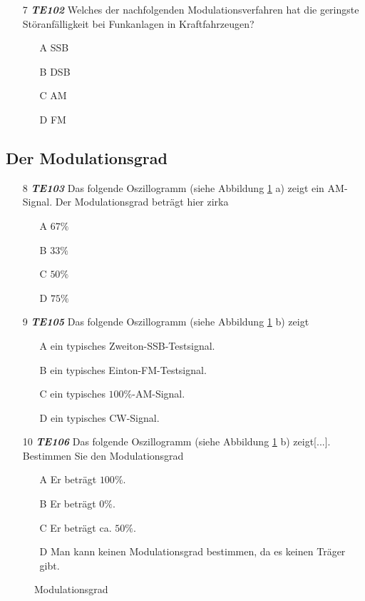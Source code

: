 \begin{enumerate}
\begin{enumerate}
	\end{enumerate} 
	\item[7] \emph{\textbf{TE102}}  Welches der nachfolgenden Modulationsverfahren hat die geringste Störanfälligkeit bei Funkanlagen in Kraftfahrzeugen?  
	\begin{enumerate}
	\itemsep1pt\parskip0pt
		\item[A] SSB
		\item[B] DSB
		\item[C] AM 
		\item[D] FM
	\end{enumerate} 
\end{enumerate}

\subsection*{Der Modulationsgrad}

\begin{enumerate} 
	\item[8] \emph{\textbf{TE103}}  Das folgende Oszillogramm (siehe Abbildung \ref{Modgrad} a) zeigt ein AM-Signal. Der Modulationsgrad beträgt hier zirka
	\begin{enumerate}
	\itemsep1pt\parskip0pt
		\item[A] $67\%$
		\item[B] $33\%$
		\item[C] $50\%$
		\item[D] $75\%$
	\end{enumerate} 
	\item[9] \emph{\textbf{TE105}}   Das folgende Oszillogramm (siehe Abbildung \ref{Modgrad} b) zeigt
	\begin{enumerate}
	\itemsep1pt\parskip0pt
		\item[A] ein typisches Zweiton-SSB-Testsignal.
		\item[B] ein typisches Einton-FM-Testsignal.
		\item[C] ein typisches $100\%$-AM-Signal.
		\item[D] ein typisches CW-Signal.
	\end{enumerate} 
	\item[10] \emph{\textbf{TE106}}   Das folgende Oszillogramm (siehe Abbildung \ref{Modgrad} b) zeigt[...]. Bestimmen Sie den Modulationsgrad
	\begin{enumerate}
	\itemsep1pt\parskip0pt
		\item[A] Er beträgt $100\%$.
		\item[B] Er beträgt $0\%$.
		\item[C] Er beträgt ca. $50\%$.
		\item[D] Man kann keinen Modulationsgrad bestimmen, da es keinen Träger gibt.
	\end{enumerate} 
\end{enumerate} 

\begin{figure}[H]
	\centering
	\caption{Modulationsgrad}
	\label{Modgrad}
\end{figure}